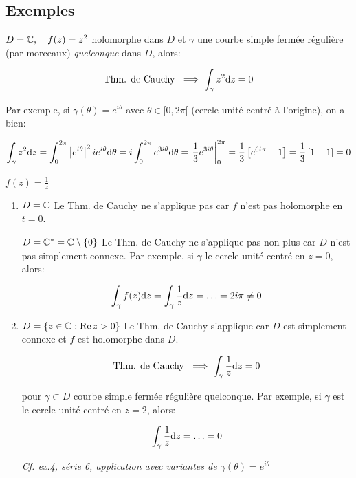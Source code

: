 \subsection{Exemples}

\begin{example}[1]
    $D = \mathbb{C}, \quad f(z) = z^2$ holomorphe dans $D$ et $\gamma$ une courbe simple fermée régulière (par morceaux) \textit{quelconque} dans $D$, alors:
    
    \[\textrm{Thm. de Cauchy } \implies \int_\gamma z^2 \mathrm{d}z = 0\]
    
    Par exemple, si $\gamma(\theta) = e^{i\theta}$ avec $\theta \in [0, 2\pi[$ (cercle unité centré à l'origine), on a bien:
    
    \[
    \int_\gamma z^2 \mathrm{d}z =
    \int_0^{2\pi} \left|e^{i\theta}\right|^2 i e^{i\theta}\mathrm{d}\theta =
    i \int_0^{2\pi} e^{3 i\theta}\mathrm{d}\theta =
    \left.\frac{1}{3} e^{3 i\theta}\right|_0^{2\pi} =
    \frac{1}{3} \left[e^{6 i \pi} - 1\right] =
    \frac{1}{3} \left[1 - 1\right] =
    0
    \]
\end{example}

\begin{example}[2]
    $f(z) = \frac{1}{z}$
    
    \begin{enumerate}[label=\alph*)]
    \item 
    $D = \mathbb{C}$ Le Thm. de Cauchy ne s'applique pas car $f$ n'est pas holomorphe en $t = 0$.
    
    $D = \mathbb{C}^\ast = \mathbb{C} \setminus \{0\}$
    Le Thm. de Cauchy ne s'applique pas non plus car $D$ n'est pas simplement connexe.
    Par exemple, si $\gamma$ le cercle unité centré en $z = 0$, alors:
    
    \[
    \int_\gamma f(z)\mathrm{d}z = \int_\gamma \frac{1}{z} \mathrm{d}z = \ldots = 2i\pi \neq 0
    \]
    
    \item 
    $D = \{z \in \mathbb{C} : \operatorname{Re} z > 0\}$
    Le Thm. de Cauchy s'applique car $D$ est simplement connexe et $f$ est holomorphe dans $D$.
    
    \[\textrm{Thm. de Cauchy } \implies \int_\gamma \frac{1}{z} \mathrm{d}z = 0\]
    
    pour $\gamma \subset D$ courbe simple fermée régulière quelconque.
    Par exemple, si $\gamma$ est le cercle unité centré en $z = 2$, alors:
    
    \[
    \int_\gamma \frac{1}{z} \mathrm{d}z = \ldots = 0
    \]
    
    \textit{Cf. ex.4, série 6, application avec variantes de $\gamma(\theta) = e^{i\theta}$}
    \end{enumerate}
\end{example}

